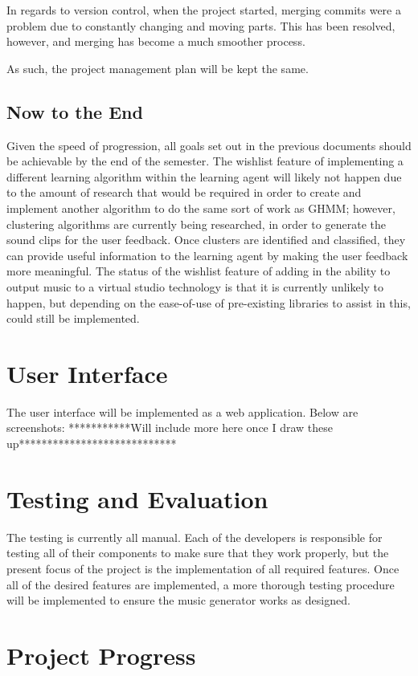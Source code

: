 \documentclass{article}
\begin{document}
In regards to version control, when the project started, merging commits were a problem due to constantly 
changing and moving parts. This has been resolved, however, and merging has become a much smoother process.

As such, the project management plan will be kept the same.

\subsection{Now to the End}
Given the speed of progression, all goals set out in the previous documents should be achievable
by the end of the semester. The wishlist feature of implementing a different learning algorithm
within the learning agent will likely not happen due to the amount of research that would be 
required in order to create and implement another algorithm to do the same sort of work as GHMM; 
however, clustering algorithms are currently being researched, in order to generate the sound 
clips for the user feedback. Once clusters are identified and classified, they can provide useful 
information to the learning agent by making the user feedback more meaningful. The status of the 
wishlist feature of adding in the ability to output music to a virtual studio technology is that 
it is currently unlikely to happen, but depending on the ease-of-use of pre-existing libraries 
to assist in this, could still be implemented.

\section{User Interface}
The user interface will be implemented as a web application. Below are screenshots:
***********Will include more here once I draw these up****************************

\section{Testing and Evaluation}
The testing is currently all manual. Each of the developers is responsible for testing all of their
components to make sure that they work properly, but the present focus of the project is the 
implementation of all required features. Once all of the desired features are implemented, a
more thorough testing procedure will be implemented to ensure the music generator works as designed.

\section{Project Progress}
\end{document}
